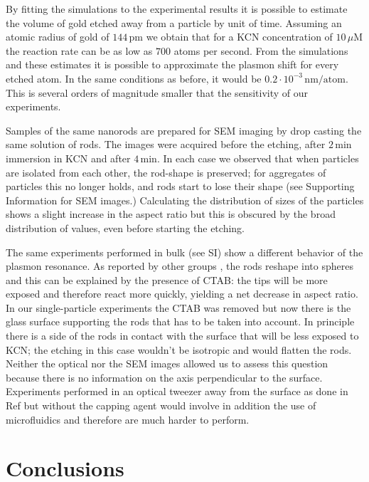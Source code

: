 \documentclass[a4paper,oneside,onecolumn]{article}
\newcommand{\uM}{\ensuremath{\,\mu\textrm{M}}}
\begin{document}
By fitting the simulations to the experimental results it is possible to
estimate the volume of gold etched away from a particle by unit of time.
Assuming an atomic radius of gold of $144\,\textrm{pm}$\cite{Pauling1947} we
obtain that for a KCN concentration of $10\uM$ the reaction rate can be as low
as $700$ atoms per second. From the simulations and these estimates it is
possible to approximate the plasmon shift for every etched atom. In the same
conditions as before, it would be $0.2\cdot 10^{-3}\, \textrm{nm}/
\textrm{atom}$. This is several orders of magnitude smaller that the sensitivity
of our experiments.

Samples of the same nanorods are prepared for SEM imaging by drop casting the
same solution of rods. The images were acquired before the etching, after
$2\,\textrm{min}$ immersion in KCN and after $4\,\textrm{min}$. In each case we
observed that when particles are isolated from each other, the rod-shape is
preserved; for aggregates of particles this no longer holds, and rods start to
lose their shape (see Supporting Information for SEM images.) Calculating the
distribution of sizes of the particles shows a slight increase in the aspect
ratio but this is obscured by the broad distribution of values, even before
starting the etching.

The same experiments performed in bulk (see SI) show a different behavior of
the plasmon resonance. As reported by other groups \cite{Jana2002}
\cite{Yuan2015}, the rods reshape into spheres and this can be explained by the
presence of CTAB: the tips will be more exposed and therefore react more
quickly, yielding a net decrease in aspect ratio. In our single-particle
experiments the CTAB was removed but now there is the glass surface supporting
the rods that has to be taken into account. In principle there is a side of the
rods in contact with the surface that will be less exposed to KCN; the etching
in this case wouldn't be isotropic and would flatten the rods. Neither the
optical nor the SEM images allowed us to assess this question because there is
no information on the axis perpendicular to the surface. Experiments performed
in an optical tweezer away from the surface as done in Ref \cite{Ni2012} but
without the capping agent would involve in addition the use of microfluidics and
therefore are much harder to perform.

\section{Conclusions}
\end{document}
